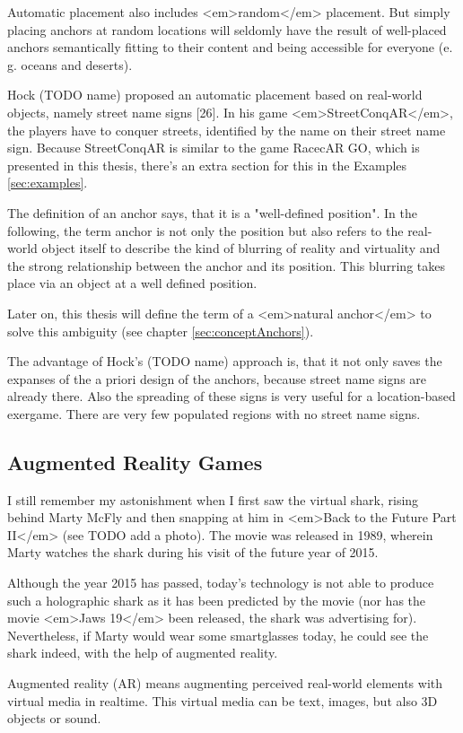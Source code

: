 Automatic placement also includes <em>random</em> placement. But simply placing anchors at random locations will seldomly have the result of well-placed anchors semantically fitting to their content and being accessible for everyone (e. g. oceans and deserts).

Hock (TODO name) proposed an automatic placement based on real-world objects, namely street name signs [26]. In his game <em>StreetConqAR</em>, the players have to conquer streets, identified by the name on their street name sign. Because StreetConqAR is similar to the game RacecAR GO, which is presented in this thesis, there's an extra section for this in the Examples \ref{sec:examples}.

The definition of an anchor says, that it is a "well-defined position". In the following, the term anchor is not only the position but also refers to the real-world object itself to describe the kind of blurring of reality and virtuality and the strong relationship between the anchor and its position. This blurring takes place via an object at a well defined position.

Later on, this thesis will define the term of a <em>natural anchor</em> to solve this ambiguity (see chapter \ref{sec:conceptAnchors}).

The advantage of Hock's (TODO name) approach is, that it not only saves the expanses of the a priori design of the anchors, because street name signs are already there. Also the spreading of these signs is very useful for a location-based exergame. There are very few populated regions with no street name signs.

\subsection{Augmented Reality Games}
I still remember my astonishment when I first saw the virtual shark, rising behind Marty McFly and then snapping at him in <em>Back to the Future Part II</em> (see TODO add a photo). The movie was released in 1989, wherein Marty watches the shark during his visit of the future year of 2015.

Although the year 2015 has passed, today’s technology is not able to produce such a holographic shark as it has been predicted by the movie (nor has the movie <em>Jaws 19</em> been released, the shark was advertising for).
Nevertheless, if Marty would wear some smartglasses today, he could see the shark indeed, with the help of augmented reality.

Augmented reality (AR) means augmenting perceived real-world elements with virtual media in realtime. This virtual media can be text, images, but also 3D objects or sound.

